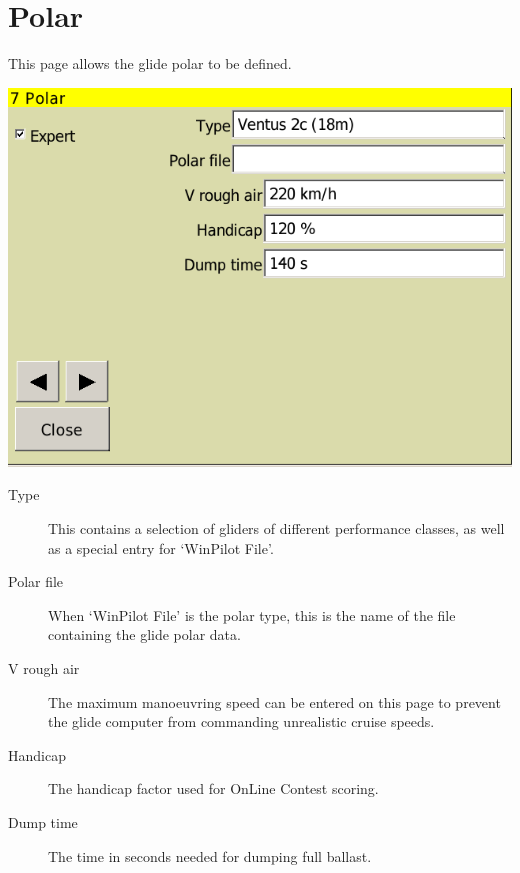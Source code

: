 \documentclass[a4paper,12pt]{refrep}
\begin{document}
\clearpage
\section{Polar}

This page allows the glide polar to be defined.

\begin{center}
\includegraphics[angle=0,width=\linewidth,keepaspectratio='true']{figures/config-5.png}
\end{center}

\begin{description}
\item[Type] 
This contains a selection of gliders of different performance
classes, as well as a special entry for `WinPilot File'.  
\item[Polar file]  When `WinPilot File' is the polar type, 
 this is the name of the file containing the glide polar data.
\item[V rough air] The maximum manoeuvring speed can be entered on this page to prevent the glide computer from commanding unrealistic cruise speeds.
\item[Handicap] The handicap factor used for OnLine Contest scoring.
\item[Dump time] The time in seconds needed for dumping full ballast.
\end{description}
\end{document}
